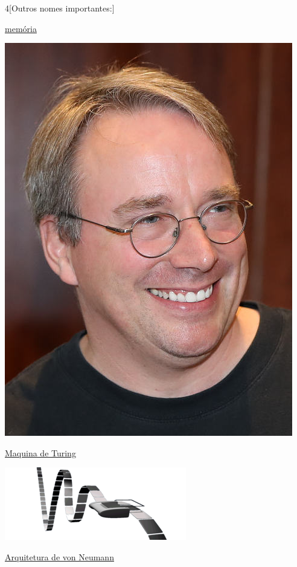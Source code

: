 \begin{multicols}{4}[Outros nomes importantes:]
\vfill\null
\columnbreak			
			
			\href{https://pt.wikipedia.org/wiki/Mem\%C3\%B3ria_de_computador}{memória}
			
\begin{center}
				\includegraphics[width=.8\columnwidth]{./IMG-GIT/CIENTISTAS/linus.jpeg}
\end{center}
			
			\vfill\null
			\pagebreak	
			
			\href{https://pt.wikipedia.org/wiki/M\%C3\%A1quina_de_Turing}{Maquina de Turing}
			
			\includegraphics[height=.8\textheight]{./IMG-GIT/CIENTISTAS/300px-Turing_Machine.png}
			
\vfill\null
\pagebreak
			
				    \href{https://pt.wikipedia.org/wiki/Arquitetura_de_von_Neumann}{Arquitetura de von Neumann}


\end{multicols}
